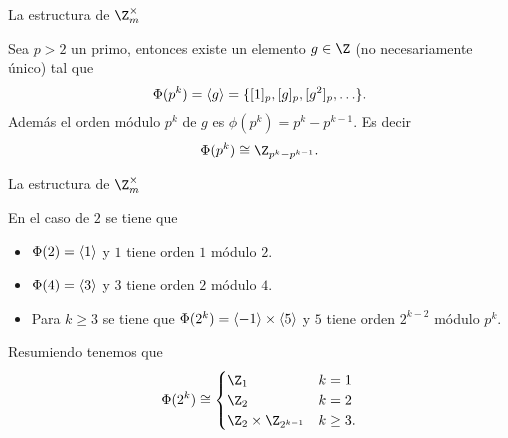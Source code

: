 \begin{frame}{La estructura de $\Z_m^\times$}
  \begin{theorem}
    Sea $p>2$ un primo, entonces existe un elemento $g \in \Z$ (no necesariamente único) tal que
    \[
        \Phi(p^k) = \langle g \rangle = \{ [1]_p,  [g]_p, [g^2]_p, \ldots \} .
    \]
    \pause
    Además el orden módulo $p^k$ de $g$ es $\phi(p^k) = p^k - p^{k-1}$. Es decir
    \[
        \Phi(p^k) \cong \Z_{p^k - p^{k-1}}.
    \]
\end{theorem}
\end{frame}


\begin{frame}{La estructura de $\Z_m^\times$}
  \begin{theorem}
    En el caso de $2$ se tiene que
    \pause
    \begin{itemize}[<+->]
        \item $\Phi(2) = \langle1\rangle$ y $1$ tiene orden $1$ módulo $2$.
        \item $\Phi(4) = \langle3\rangle$ y $3$ tiene orden $2$ módulo $4$.
        \item Para $k\geq 3$ se tiene que $\Phi(2^k) = \langle-1\rangle \times \langle5\rangle$ y $5$ tiene orden $2^{k-2}$ módulo $p^k$.
    \end{itemize}
    \pause
    Resumiendo tenemos que
    \begin{align*}
        \Phi(2^k) \cong \begin{cases}
            \Z_1 & k=1 \\
            \Z_2 & k=2 \\
            \Z_2 \times \Z_{2^{k-1}} & k\geq 3.
        \end{cases}
    \end{align*}
\end{theorem}
\end{frame}